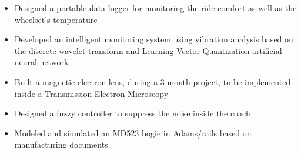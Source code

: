 \documentclass[10pt,letterpaper,ragged2e,compact]{mocv}
\begin{document}
\begin{paracol}{2}
    \begin{itemize}
        \item Designed a portable data-logger for monitoring the ride comfort as well as the wheelset’s temperature
    \end{itemize}
    \divider
    \begin{itemize}
        \item Developed an intelligent monitoring system using vibration analysis based on the discrete wavelet transform and Learning Vector Quantization artificial neural network
    \end{itemize}
    \divider
    \begin{itemize}
        \item  Built a magnetic electron lens, during a 3-month project, to be implemented inside a Transmission Electron Microscopy
    \end{itemize}
    \divider
    \begin{itemize}
        \item Designed a fuzzy controller to suppress the noise inside the coach
    \end{itemize}
    \divider
    \begin{itemize}
        \item Modeled and simulated an MD523 bogie in Adams/rails based on manufacturing documents
    \end{itemize}


\end{paracol}
\end{document}
